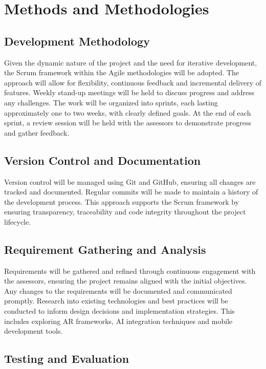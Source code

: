\documentclass[12pt]{article}
\begin{document}
\section{Methods and Methodologies}
    \subsection{Development Methodology}
    Given the dynamic nature of the project and the need for iterative development, the Scrum framework within the Agile methodologies will be adopted. The approach will allow for flexibility, continuous feedback
    and incremental delivery of features. Weekly stand-up meetings will be held to discuss progress and address any challenges. The work will be organized into sprints, each lasting approximately one to two weeks,
    with clearly defined goals. At the end of each sprint, a review session will be held with the assessors to demonstrate progress and gather feedback.
    
    \subsection{Version Control and Documentation}
    Version control will be managed using Git and GitHub, ensuring all changes are tracked and documented. Regular commits will be made to maintain a history of the development process. This
    approach supports the Scrum framework by ensuring transparency, traceability and code integrity throughout the project lifecycle.

    \subsection{Requirement Gathering and Analysis}
    Requirements will be gathered and refined through continuous engagement with the assessors, ensuring the project remains aligned with the initial objectives. Any changes to the requirements will be documented and communicated promptly.
    Research into existing technologies and best practices will be conducted to inform design decisions and implementation strategies. This includes exploring AR frameworks, AI integration techniques and mobile development tools.

    \subsection{Testing and Evaluation}
\end{document}
